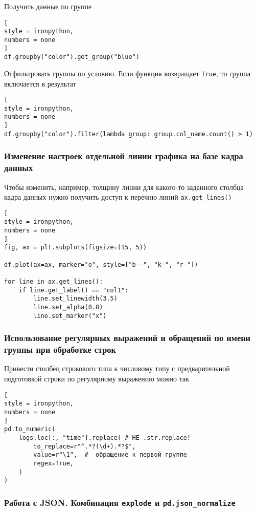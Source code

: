 \documentclass[%
	11pt,
	a4paper,
	utf8,
		]{article}
\begin{document}
Получить данные по группе
\begin{lstlisting}[
style = ironpython,
numbers = none
]
df.groupby("color").get_group("blue")
\end{lstlisting}

Отфильтровать группы по условию. Если функция возвращает \texttt{True}, то группа включается в результат
\begin{lstlisting}[
style = ironpython,
numbers = none
]
df.groupby("color").filter(lambda group: group.col_name.count() > 1)
\end{lstlisting}

\subsubsection{Изменение настроек отдельной линии графика на базе кадра данных}
Чтобы изменить, например, толщину линии для какого-то заданного столбца кадра данных нужно получить доступ к перечню линий \verb|ax.get_lines()|
\begin{lstlisting}[
style = ironpython,
numbers = none
]
fig, ax = plt.subplots(figsize=(15, 5))

df.plot(ax=ax, marker="o", style=["b--", "k-", "r-"])

for line in ax.get_lines():
    if line.get_label() == "col1":
        line.set_linewidth(3.5)
        line.set_alpha(0.8)
        line.set_marker("x")
\end{lstlisting}

\subsubsection{Использование регулярных выражений и обращений по имени группы при обработке строк}

Привести столбец строкового типа к числовому типу с предварительной подготовкой строки по регулярному выражению можно так
\begin{lstlisting}[
style = ironpython,
numbers = none	
]
pd.to_numeric(
    logs.loc[:, "time"].replace( # НЕ .str.replace!
        to_replace=r"^.*?(\d+).*?$",
        value=r"\1",  #  обращение к первой группе
        regex=True,
    )
)
\end{lstlisting}

\subsubsection{Работа с JSON. Комбинация \texttt{explode} и \texttt{pd.json\_normalize}}
\end{document}
